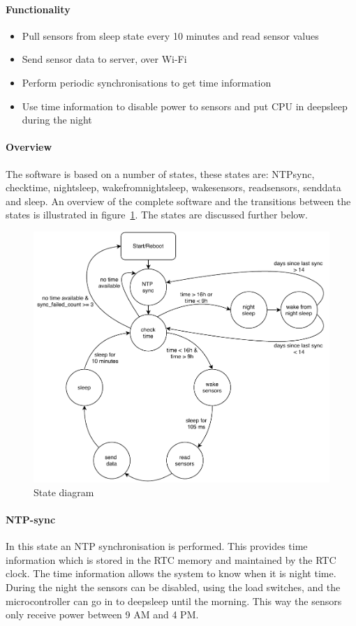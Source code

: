 \documentclass[11pt,a4paper]{article}
\begin{document}
\paragraph{Functionality}
\begin{itemize}
	\item Pull sensors from sleep state every 10 minutes and read sensor values
	\item Send sensor data to server, over Wi-Fi
	\item Perform periodic synchronisations to get time information
	\item Use time information to disable power to sensors and put CPU in deepsleep during the night
\end{itemize}
\paragraph{Overview}
The software is based on a number of states, these states are: NTPsync, checktime, nightsleep, wakefromnightsleep, wakesensors, readsensors, senddata and sleep. An overview of the complete software and the transitions between the states is illustrated in figure~\ref{fig:statediagram}. The states are discussed further below. 
\begin{figure}[!ht]
	\centering
	\includegraphics[width=1\linewidth]{statendiagram.pdf}
	\caption{State diagram}
	\label{fig:statediagram}
\end{figure}
\paragraph{NTP-sync}
In this state an NTP synchronisation is performed. This provides time information which is stored in the RTC memory and maintained by the RTC clock. The time information allows the system to know when it is night time. During the night the sensors can be disabled, using the load switches, and the microcontroller can go in to deepsleep until the morning. This way the sensors only receive power between 9 AM and 4 PM. 
\end{document}
